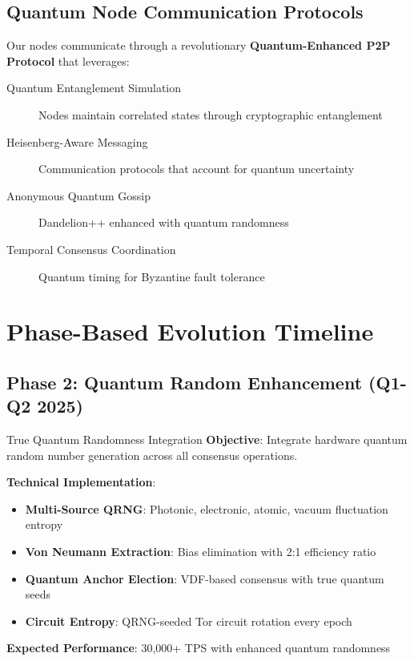 \documentclass[11pt,a4paper]{article}
\begin{document}
\subsection{Quantum Node Communication Protocols}

Our nodes communicate through a revolutionary \textbf{Quantum-Enhanced P2P Protocol} that leverages:

\begin{description}
\item[Quantum Entanglement Simulation] Nodes maintain correlated states through cryptographic entanglement
\item[Heisenberg-Aware Messaging] Communication protocols that account for quantum uncertainty
\item[Anonymous Quantum Gossip] Dandelion++ enhanced with quantum randomness
\item[Temporal Consensus Coordination] Quantum timing for Byzantine fault tolerance
\end{description}

\section{Phase-Based Evolution Timeline}

\subsection{Phase 2: Quantum Random Enhancement (Q1-Q2 2025)}

\begin{phasebox}{True Quantum Randomness Integration}
\textbf{Objective}: Integrate hardware quantum random number generation across all consensus operations.

\textbf{Technical Implementation}:
\begin{itemize}
\item \textbf{Multi-Source QRNG}: Photonic, electronic, atomic, vacuum fluctuation entropy
\item \textbf{Von Neumann Extraction}: Bias elimination with 2:1 efficiency ratio
\item \textbf{Quantum Anchor Election}: VDF-based consensus with true quantum seeds
\item \textbf{Circuit Entropy}: QRNG-seeded Tor circuit rotation every epoch
\end{itemize}

\textbf{Expected Performance}: 30,000+ TPS with enhanced quantum randomness
\end{phasebox}
\end{document}
